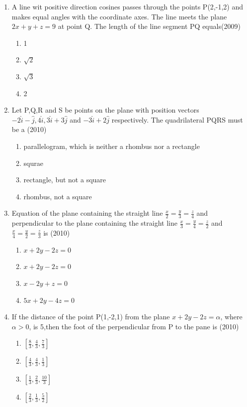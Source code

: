 \documentclass[12pt]{article}
\providecommand{\sbrak}[1]{\ensuremath{{}\left[#1\right]}}
\begin{document}
\begin{enumerate}
\begin{enumerate}
\end{enumerate}
\item A line wit positive direction cosines passes through the points P(2,-1,2) and makes equal angles with the coordinate axes. The line meets the plane $2x+y+z=9$ at point Q. The length of the line segment PQ equals(2009)
\begin{enumerate}
\item 1
\item $\sqrt{2}$
\item $\sqrt{3}$
\item 2
\end{enumerate}
\item Let P,Q,R and S be points on the plane with position vectors $-2\hat{i}-\hat{j},4\hat{i},3\hat{i}+3\hat{j}$ and $-3\hat{i}+2\hat{j}$ respectively. The quadrilateral PQRS must be a (2010)
\begin{enumerate}
\item parallelogram, which is neither a rhombus nor a rectangle
\item squrae
\item rectangle, but not a square
\item rhombus, not a square
\end{enumerate}
\item Equation of the plane containing the straight line $\frac{x}{2}=\frac{y}{3}=\frac{z}{4}$ and perpendicular to the plane containing the straight line $\frac{x}{3}=\frac{y}{4}=\frac{z}{2}$ and $\frac{x}{4}=\frac{y}{2}=\frac{z}{3}$ is (2010)
\begin{enumerate}
\item $x+2y-2z=0$
\item $x+2y-2z=0$
\item $x-2y+z=0$
\item $5x+2y-4z=0$
\end{enumerate}
\item  If the distance of the point P(1,-2,1) from the plane $x+2y-2z=\alpha$, where$\alpha>0$, is 5,then the foot of the perpendicular from P to the pane is (2010)
\begin{enumerate}
\item $\sbrak{\frac{8}{3},\frac{4}{3},\frac{7}{3}}$
\item $\sbrak{\frac{4}{3},\frac{4}{3},\frac{1}{3}}$
\item $\sbrak{\frac{1}{3},\frac{2}{3},\frac{10}{3}}$
\item $\sbrak{\frac{2}{3},\frac{1}{3},\frac{5}{2}}$
\end{enumerate}

\end{enumerate}
\end{document}
